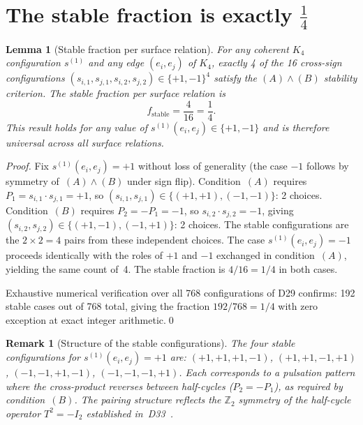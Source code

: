 \documentclass[12pt,a4paper]{article}
\newtheorem{lemma}[theorem]{Lemma}
\newtheorem{remark}[theorem]{Remark}
\newcommand{\Kfour}{K_4}
\begin{document}
\section{The stable fraction is exactly \texorpdfstring{$\tfrac{1}{4}$}{1/4}}
\label{sec:fraction}

\begin{lemma}[Stable fraction per surface relation]
\label{lem:fraction}
For any coherent $\Kfour$ configuration $s^{(1)}$ and any edge $(e_i, e_j)$ of $\Kfour$, exactly 4 of the 16 cross-sign configurations $(s_{i,1}, s_{j,1}, s_{i,2}, s_{j,2}) \in \{+1,-1\}^4$ satisfy the $(A)\wedge(B)$ stability criterion. The stable fraction per surface relation is
\begin{equation}
f_{\mathrm{stable}} = \frac{4}{16} = \frac{1}{4}.
\label{eq:fraction}
\end{equation}
This result holds for any value of $s^{(1)}(e_i,e_j) \in \{+1,-1\}$ and is therefore universal across all surface relations.
\end{lemma}

\begin{proof}
Fix $s^{(1)}(e_i,e_j) = +1$ without loss of generality (the case $-1$ follows by symmetry of~$(A)\wedge(B)$ under sign flip). Condition~$(A)$ requires $P_1 = s_{i,1}\cdot s_{j,1} = +1$, so $(s_{i,1}, s_{j,1}) \in \{(+1,+1), (-1,-1)\}$: 2 choices. Condition~$(B)$ requires $P_2 = -P_1 = -1$, so $s_{i,2}\cdot s_{j,2} = -1$, giving $(s_{i,2}, s_{j,2}) \in \{(+1,-1), (-1,+1)\}$: 2 choices. The stable configurations are the $2 \times 2 = 4$ pairs from these independent choices. The case $s^{(1)}(e_i,e_j) = -1$ proceeds identically with the roles of $+1$ and $-1$ exchanged in condition~$(A)$, yielding the same count of~4. The stable fraction is $4/16 = 1/4$ in both cases.

Exhaustive numerical verification over all 768 configurations of D29 confirms: 192 stable cases out of 768 total, giving the fraction $192/768 = 1/4$ with zero exception at exact integer arithmetic.\qed
\end{proof}

\begin{remark}[Structure of the stable configurations]
The four stable configurations for $s^{(1)}(e_i,e_j)=+1$ are:
$(+1,+1,+1,-1)$, $(+1,+1,-1,+1)$, $(-1,-1,+1,-1)$, $(-1,-1,-1,+1)$.
Each corresponds to a pulsation pattern where the cross-product reverses between half-cycles ($P_2 = -P_1$), as required by condition~$(B)$. The pairing structure reflects the $\mathbb{Z}_2$ symmetry of the half-cycle operator $T^2 = -I_2$ established in~D33~\cite{PDL_D33_2026}.
\end{remark}
\end{document}
